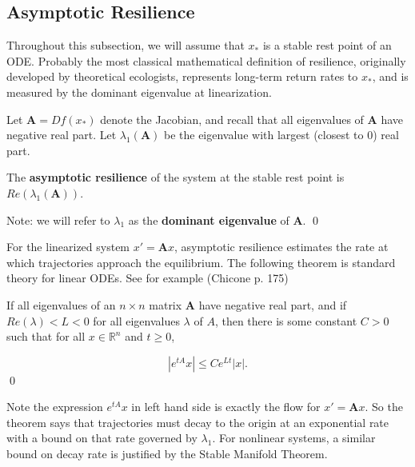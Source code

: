 \subsection{Asymptotic Resilience}

Throughout this subsection, we will assume that $x_\ast$ is a stable rest point of an ODE. Probably the most classical mathematical definition of resilience, originally developed by theoretical ecologists, represents long-term return rates to $x_{\ast}$, and is measured by the dominant eigenvalue at linearization. 

\begin{definition}
	\label{def:asymp}
	 Let $\textbf{A} = Df(x_\ast)$ denote the Jacobian, and recall that all eigenvalues of $\mathbf{A}$ have negative real part. Let $\lambda_1(\textbf{A})$ be the eigenvalue with largest (closest to 0) real part. 
	
	\begin{center}
	The \textbf{asymptotic resilience} of the system at the stable rest point is $Re(\lambda_1(\textbf{A}))$.
	\end{center}
Note: we will refer to $\lambda_1$ as the \textbf{dominant eigenvalue} of $\mathbf{A}$. 
	 \qed 
\end{definition}

For the linearized system $x'= \textbf{A}x$, asymptotic resilience estimates the rate at which trajectories approach the equilibrium. The following theorem is standard theory for linear ODEs. See for example (Chicone p. 175) 

\begin{theorem}
	If all eigenvalues of an $n \times n$ matrix $\mathbf{A}$ have negative real part, and if $Re(\lambda) < L < 0$ for all eigenvalues $\lambda$ of $A$, then there is some constant $C>0$ such that for all $x \in \mathbb{R}^n$ and $t \geq 0$,
	
	$$|e^{tA}x| \leq Ce^{L t}|x|.$$  \qed
\end{theorem}

Note the expression $e^{tA}x$ in left hand side is exactly the flow for $x' = \mathbf{A}x$. So the theorem says that trajectories must decay to the origin at an exponential rate with a bound on that rate governed by $\lambda_1$. For nonlinear systems, a similar bound on decay rate is justified by the Stable Manifold Theorem. %

%

